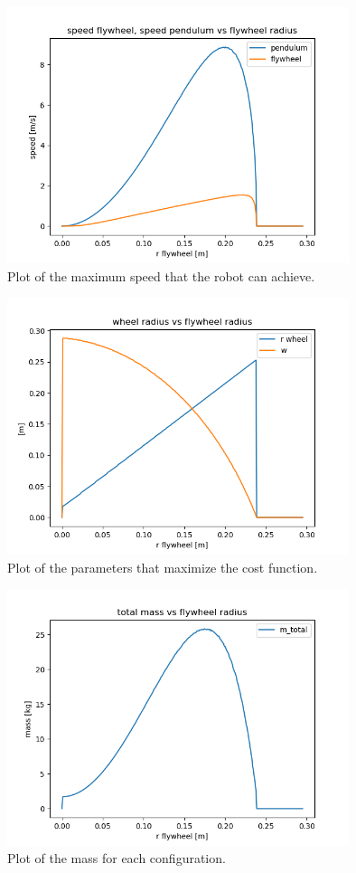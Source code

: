 \begin{figure}[ht]
	\centering
	\includegraphics[width=10cm]{img/optimization/speed.png}
	\caption{Plot of the maximum speed that the robot can achieve.}
	\label{fig:Speed plot}
\end{figure}

\begin{figure}[ht]
	\centering
	\includegraphics[width=10cm]{img/optimization/parameters.png}
	\caption{Plot of the parameters that maximize the cost function.}
	\label{fig:Parameters plot}
\end{figure}

\begin{figure}[ht]
	\centering
	\includegraphics[width=10cm]{img/optimization/mass.png}
	\caption{Plot of the mass for each configuration.}
	\label{fig:Mass plot}
\end{figure}

